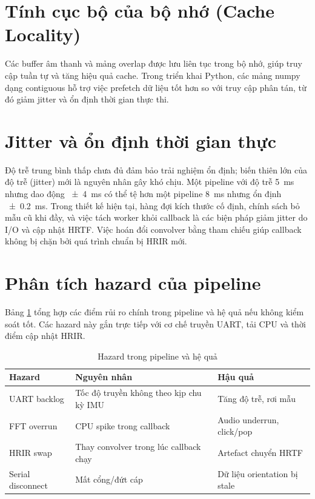 \section{Tính cục bộ của bộ nhớ (Cache Locality)}
Các buffer âm thanh và mảng overlap được lưu liên tục trong bộ nhớ, giúp truy cập tuần tự và tăng hiệu quả cache. Trong triển khai Python, các mảng numpy dạng contiguous hỗ trợ việc prefetch dữ liệu tốt hơn so với truy cập phân tán, từ đó giảm jitter và ổn định thời gian thực thi.

\section{Jitter và ổn định thời gian thực}
Độ trễ trung bình thấp chưa đủ đảm bảo trải nghiệm ổn định; biến thiên lớn của độ trễ (jitter) mới là nguyên nhân gây khó chịu. Một pipeline với độ trễ \SI{5}{\milli\second} nhưng dao động \SI{\pm 4}{\milli\second} có thể tệ hơn một pipeline \SI{8}{\milli\second} nhưng ổn định \SI{\pm 0.2}{\milli\second}. Trong thiết kế hiện tại, hàng đợi kích thước cố định, chính sách bỏ mẫu cũ khi đầy, và việc tách worker khỏi callback là các biện pháp giảm jitter do I/O và cập nhật HRTF. Việc hoán đổi convolver bằng tham chiếu giúp callback không bị chặn bởi quá trình chuẩn bị HRIR mới.

\section{Phân tích hazard của pipeline}
Bảng \ref{tab:pipeline_hazard} tổng hợp các điểm rủi ro chính trong pipeline và hệ quả nếu không kiểm soát tốt. Các hazard này gắn trực tiếp với cơ chế truyền UART, tải CPU và thời điểm cập nhật HRIR.

\begin{table}[H]
\centering
\caption{Hazard trong pipeline và hệ quả}
\label{tab:pipeline_hazard}
\vspace{0.2cm}
\renewcommand{\arraystretch}{1.2}
\begin{tabular}{lll}
\toprule
\textbf{Hazard} & \textbf{Nguyên nhân} & \textbf{Hậu quả} \\
\midrule
UART backlog & Tốc độ truyền không theo kịp chu kỳ IMU & Tăng độ trễ, rơi mẫu \\
FFT overrun & CPU spike trong callback & Audio underrun, click/pop \\
HRIR swap & Thay convolver trong lúc callback chạy & Artefact chuyển HRTF \\
Serial disconnect & Mất cổng/đứt cáp & Dữ liệu orientation bị stale \\
\bottomrule
\end{tabular}
\end{table}

